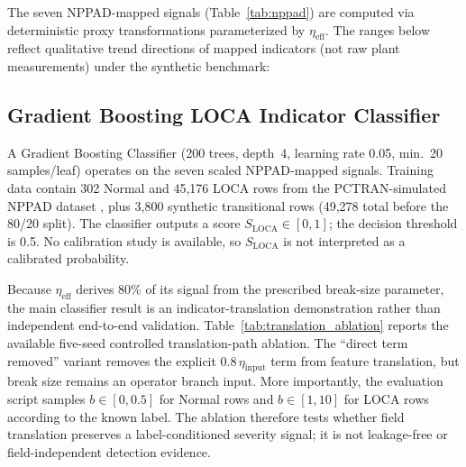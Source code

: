 \documentclass[journal]{IEEEtran}
\newcommand{\added}[1]{#1}
\begin{document}
The seven NPPAD-mapped signals (Table~\ref{tab:nppad}) are computed via deterministic proxy transformations parameterized by $\eta_\text{eff}$. The ranges below reflect qualitative trend directions of mapped indicators (not raw plant measurements) under the synthetic benchmark:

\begin{table}[htbp]
\caption{Qualitative trends of NPPAD-mapped indicators with increasing severity. Values are heuristic proxies from the synthetic workflow, not plant measurements.}
\label{tab:nppad}
\centering
{}
\end{table}

\subsection{Gradient Boosting LOCA Indicator Classifier}

A Gradient Boosting Classifier (200 trees, depth~4, learning rate 0.05, min.\ 20 samples/leaf) operates on the seven scaled NPPAD-mapped signals. Training data contain 302 Normal and 45,176 LOCA rows from the \added{PCTRAN-simulated} NPPAD dataset \cite{qi2022nppad}, plus 3,800 synthetic transitional rows (49,278 total before the 80/20 split). The classifier outputs a score $S_{\mathrm{LOCA}}\in[0,1]$; the decision threshold is 0.5. \added{No calibration study is available, so $S_{\mathrm{LOCA}}$ is not interpreted as a calibrated probability.}

Because $\eta_\text{eff}$ derives 80\% of its signal from the prescribed break-size parameter, the main classifier result is an indicator-translation demonstration rather than independent end-to-end validation.  \added{Table~\ref{tab:translation_ablation} reports the available five-seed controlled translation-path ablation. The ``direct term removed'' variant removes the explicit $0.8\,\eta_\mathrm{input}$ term from feature translation, but break size remains an operator branch input. More importantly, the evaluation script samples $b\in[0,0.5]$ for Normal rows and $b\in[1,10]$ for LOCA rows according to the known label. The ablation therefore tests whether field translation preserves a label-conditioned severity signal; it is not leakage-free or field-independent detection evidence.}
\end{document}

